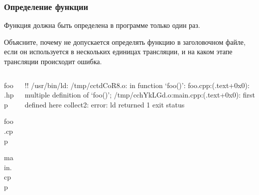 \documentclass[compress, 8pt]{beamer}
\begin{document}
\begin{frame}[fragile]

    \frametitle{Определение функции}

    \hfill\break
    Функция должна быть определена в программе только один раз\footnotemark{}.


    \begin{task}
        Объясните, почему не допускается определять функцию в заголовочном файле,
        если он используется в нескольких единицах трансляции, и на каком этапе трансляции
        происходит ошибка.
    \end{task}

    \begin{columns}[T]

        \begin{column}{0.5\textwidth}

                {foo.hpp}

                {foo.cpp}

                {main.cpp}

        \end{column}

        \begin{column}{0.5\textwidth}

            \begin{terminalwindow}
!!
/usr/bin/ld: /tmp/cctdCoR8.o: in function `foo()':
foo.cpp:(.text+0x0): multiple definition of `foo()'; /tmp/cchYkLGd.o:main.cpp:(.text+0x0): first defined here
collect2: error: ld returned 1 exit status
            \end{terminalwindow}

        \end{column}

    \end{columns}

\end{frame}
\end{document}
